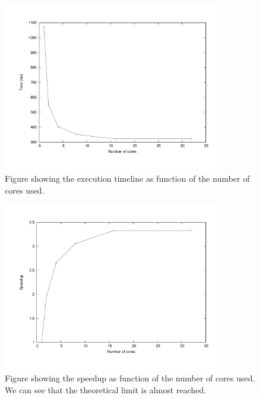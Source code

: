 \documentclass[a4paper,11pt]{article}
\begin{document}
\begin{enumerate}
  \begin{figure}[!h]
    \begin{center}
    \includegraphics[width=0.85\textwidth]{3dfft/processors_time_ms.pdf}
    \caption{Figure showing the execution timeline as function of the
      number of cores used.}
    \end{center}
  \end{figure}

  \begin{figure}[!h]
    \begin{center}
      \includegraphics[width=0.85\textwidth]{3dfft/processors_speedup.pdf}
    \caption{Figure showing the speedup as function of the number of
      cores used. We can see that the theoretical limit is almost
      reached.}
    \end{center}
  \end{figure}

\end{enumerate}
\end{document}
